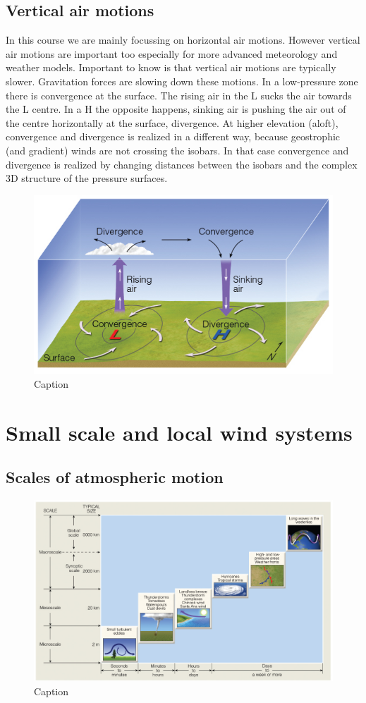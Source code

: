 \documentclass[oneside]{book}
\begin{document}
\subsection{Vertical air motions}\label{vertical-air-motions}

In this course we are mainly focussing on horizontal air motions.
However vertical air motions are important too especially for more
advanced meteorology and weather models. Important to know is that
vertical air motions are typically slower. Gravitation forces are
slowing down these motions. In a low-pressure zone there is convergence
at the surface. The rising air in the L sucks the air towards the L
centre. In a H the opposite happens, sinking air is pushing the air out
of the centre horizontally at the surface, divergence. At higher
elevation (aloft), convergence and divergence is realized in a different
way, because geostrophic (and gradient) winds are not crossing the
isobars. In that case convergence and divergence is realized by changing
distances between the isobars and the complex 3D structure of the
pressure surfaces.

\begin{figure}

{\centering \includegraphics[width=0.4\linewidth]{figures/Figure416} 

}

\caption{Caption}\label{fig:VAR}
\end{figure}

\section{Small scale and local wind
systems}\label{small-scale-and-local-wind-systems}

\subsection{Scales of atmospheric
motion}\label{scales-of-atmospheric-motion}

\begin{figure}

{\centering \includegraphics[width=0.4\linewidth]{figures/Figure417} 

}

\caption{Caption}\label{fig:scales}
\end{figure}
\end{document}

